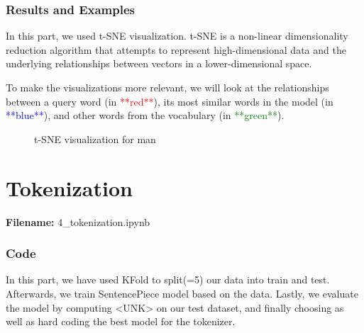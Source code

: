 \documentclass[12pt, a4paper]{article}
\begin{document}
\section*{Results and Examples}
In this part, we used t-SNE visualization. t-SNE is a non-linear dimensionality reduction algorithm that attempts to represent high-dimensional data and the underlying relationships between vectors in a lower-dimensional space.

To make the visualizations more relevant, we will look at the relationships between a query word (in \textcolor{red}{**red**}), its most similar words in the model (in \textcolor{blue}{**blue**}), and other words from the vocabulary (in \textcolor{green}{**green**}).
\begin{figure}[H]
	\caption{t-SNE visualization for man}
	\label{word2vec_depression_man}
\end{figure}

\newpage
\part{Tokenization}
\large{\textbf{Filename:} 4\_tokenization.ipynb}

\section*{Code}
In this part, we have used KFold to split(=5) our data into train and test. Afterwards, we train SentencePiece model based on the data. Lastly, we evaluate the model by computing <UNK> on our test dataset, and finally choosing as well as hard coding the best model for the tokenizer. 
\end{document}
